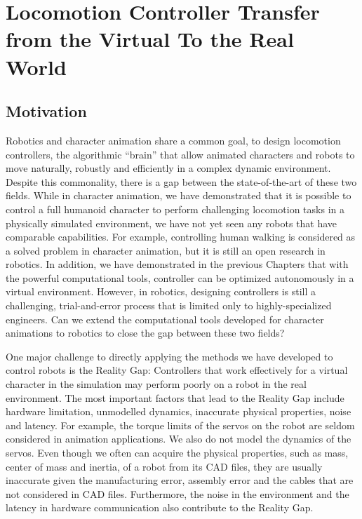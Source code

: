 \chapter{Locomotion Controller Transfer from the Virtual To the Real World}
\section{Motivation}
Robotics and character animation share a common goal, to design locomotion controllers, the algorithmic ``brain'' that allow animated characters and robots to move naturally, robustly and efficiently in a complex dynamic environment. Despite this commonality, there is a gap between the state-of-the-art of these two fields. While in character animation, we have demonstrated that it is possible to control a full humanoid character to perform challenging locomotion tasks in a physically simulated environment, we have not yet seen any robots that have comparable capabilities. For example, controlling human walking is considered as a solved problem in character animation, but it is still an open research in robotics. In addition, we have demonstrated in the previous Chapters that with the powerful computational tools, controller can be optimized autonomously in a virtual environment. However, in robotics, designing controllers is still a challenging, trial-and-error process that is limited only to highly-specialized engineers. Can we extend the computational tools developed for character animations to robotics to close the gap between these two fields?

One major challenge to directly applying the methods we have developed to control robots is the Reality Gap: Controllers that work effectively for a virtual character in the simulation may perform poorly on a robot in the real environment. The most important factors that lead to the Reality Gap include hardware limitation, unmodelled dynamics, inaccurate physical properties, noise and latency. For example, the torque limits of the servos on the robot are seldom considered in animation applications. We also do not model the dynamics of the servos. Even though we often can acquire the physical properties, such as mass, center of mass and inertia, of a robot from its CAD files, they are usually inaccurate given the manufacturing error, assembly error and the cables that are not considered in CAD files. Furthermore, the noise in the environment and the latency in hardware communication also contribute to the Reality Gap.

